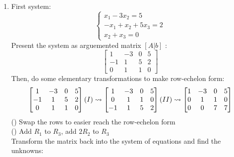 \documentclass[14pt, letterpaper, fleqn]{extarticle}
\newcommand{\RomanNumeralCaps}[1]
    {\MakeUppercase{\romannumeral #1}}
\begin{document}
\begin{enumerate}
	\item First system:
		\begin{equation*}
	      	\begin{cases}	
	      		x_1-3x_2=5 \\
	      		-x_1+x_2+5x_3=2 \\
	      		x_2+x_3=0
	      	\end{cases}
	      \end{equation*}
		Present the system as arguemented matrix $ \left[ A|b \right] $ :
	      \begin{equation*}
	      	\begin{bmatrix}
	      		1 & -3  & 0 & 5 \\
	      		-1 & 1  & 5 & 2 \\
	      		0 & 1 & 1 & 0  
	      	\end{bmatrix}
	      \end{equation*}
		Then, do some elementary transformations to make row-echelon form:
	      \begin{equation*}
	      	\begin{split}
	      		\begin{bmatrix}
					1 & -3  & 0 & 5 \\
		      		-1 & 1  & 5 & 2 \\
		      		0 & 1 & 1 & 0
	      		\end{bmatrix}
	      		(\RomanNumeralCaps{1}) \leadsto
	      		\begin{bmatrix}
					1 & -3  & 0 & 5 \\
		      		0 & 1 & 1 & 0 \\
		      		-1 & 1  & 5 & 2
	      		\end{bmatrix}
	      		(\RomanNumeralCaps{2}) \leadsto
	      		\begin{bmatrix}
					1 & -3  & 0 & 5 \\
		      		0 & 1 & 1 & 0 \\
		      		0 & 0  & 7 & 7
	      		\end{bmatrix}
	      	\end{split}
	      \end{equation*}
		(\RomanNumeralCaps{1}) Swap the rows to easier reach the row-echelon 				form \\
	      (\RomanNumeralCaps{2}) Add $R_1$ to $R_3$, add $2R_2$ to			$R_3$ \\
		Transform the matrix back into the system of equations and find the unknowns:
		\begin{equation*}

\end{equation*}
\end{enumerate}
\end{document}
